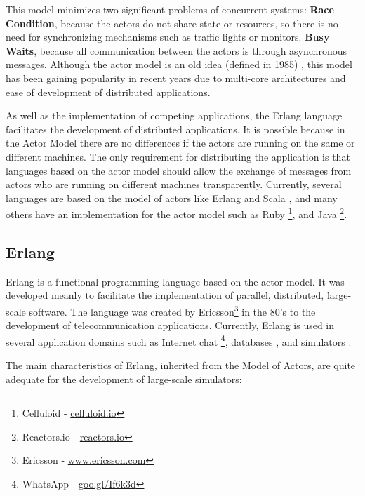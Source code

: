 This model minimizes two significant problems of concurrent systems: \textbf{Race Condition}, because the actors do not share state or resources, so there is no need for synchronizing mechanisms such as traffic lights or monitors. \textbf{Busy Waits}, because all communication between the actors is through asynchronous messages. Although the actor model is an old idea (defined in 1985) \citep {agha1985actors}, this model has been gaining popularity in recent years due to multi-core architectures and ease of development of distributed applications.

As well as the implementation of competing applications, the Erlang language facilitates the development of distributed applications. It is possible because in the Actor Model there are no differences if the actors are running on the same or different machines. The only requirement for distributing the application is that languages based on the actor model should allow the exchange of messages from actors who are running on different machines transparently. Currently, several languages are based on the model of actors like Erlang and Scala \citep{tasharofi2013scala}, and many others have an implementation for the actor model such as Ruby \footnote {Celluloid - \url{celluloid.io}}, and Java \footnote{Reactors.io - \url{reactors.io}}.

\subsection{Erlang}
\label{sub:erlang}

Erlang is a functional programming language based on the actor model. It was developed meanly to facilitate the implementation of parallel, distributed, large-scale software. The language was created by Ericsson\footnote{Ericsson - \url{www.ericsson.com}} in the 80's to the development of telecommunication applications. Currently, Erlang is used in several application domains such as Internet chat \footnote{WhatsApp - \url{goo.gl/If6k3d}}, databases \citep{anderson2010couchdb}, and simulators \citep{song2011performance,toscano2012parallel}.

The main characteristics of Erlang, inherited from the Model of Actors, are quite adequate for the development of large-scale simulators:

